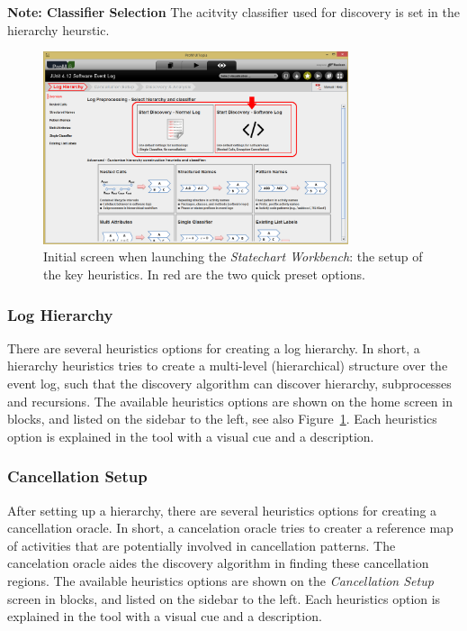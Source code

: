 \documentclass{article}
\begin{document}
\phantom\newline
\textbf{Note: Classifier Selection}
The acitvity classifier used for discovery is set in the hierarchy heurstic.

\begin{figure}[ht!]
\centering
\includegraphics[width=0.8\textwidth]{gfx/setup.png}
\caption{Initial screen when launching the \emph{Statechart Workbench}: the setup of the key heuristics. In red are the two quick preset options.}
\label{fig:setup}
\end{figure}

\subsubsection{Log Hierarchy}
There are several heuristics options for creating a log hierarchy.
In short, a hierarchy heuristics tries to create a multi-level (hierarchical) structure over the event log,
such that the discovery algorithm can discover hierarchy, subprocesses and recursions.
The available heuristics options are shown on the home screen in blocks, and listed on the sidebar to the left, see also Figure~\ref{fig:setup}.
Each heuristics option is explained in the tool with a visual cue and a description. 

\subsubsection{Cancellation Setup}
After setting up a hierarchy, there are several heuristics options for creating a cancellation oracle.
In short, a cancelation oracle tries to creater a reference map of activities that
are potentially involved in cancellation patterns.
The cancelation oracle aides the discovery algorithm in finding these cancellation regions.
The available heuristics options are shown on the \emph{Cancellation Setup} screen in blocks, and listed on the sidebar to the left.
Each heuristics option is explained in the tool with a visual cue and a description. 
\end{document}
